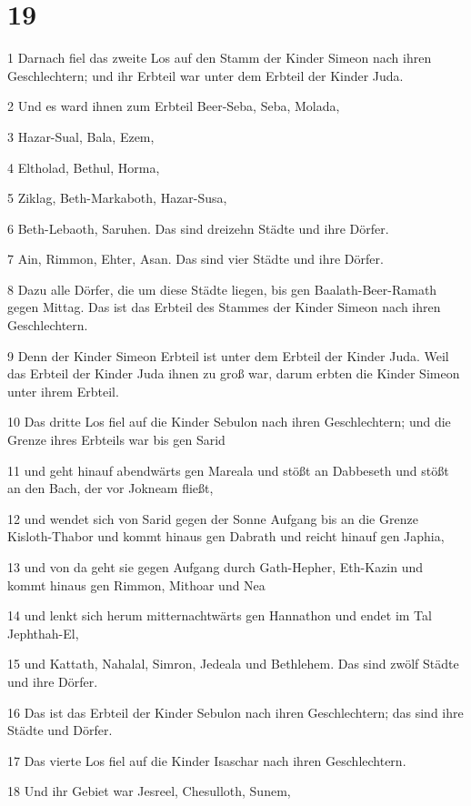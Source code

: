 \chapter{19}

\par 1 Darnach fiel das zweite Los auf den Stamm der Kinder Simeon nach ihren Geschlechtern; und ihr Erbteil war unter dem Erbteil der Kinder Juda.
\par 2 Und es ward ihnen zum Erbteil Beer-Seba, Seba, Molada,
\par 3 Hazar-Sual, Bala, Ezem,
\par 4 Eltholad, Bethul, Horma,
\par 5 Ziklag, Beth-Markaboth, Hazar-Susa,
\par 6 Beth-Lebaoth, Saruhen. Das sind dreizehn Städte und ihre Dörfer.
\par 7 Ain, Rimmon, Ehter, Asan. Das sind vier Städte und ihre Dörfer.
\par 8 Dazu alle Dörfer, die um diese Städte liegen, bis gen Baalath-Beer-Ramath gegen Mittag. Das ist das Erbteil des Stammes der Kinder Simeon nach ihren Geschlechtern.
\par 9 Denn der Kinder Simeon Erbteil ist unter dem Erbteil der Kinder Juda. Weil das Erbteil der Kinder Juda ihnen zu groß war, darum erbten die Kinder Simeon unter ihrem Erbteil.
\par 10 Das dritte Los fiel auf die Kinder Sebulon nach ihren Geschlechtern; und die Grenze ihres Erbteils war bis gen Sarid
\par 11 und geht hinauf abendwärts gen Mareala und stößt an Dabbeseth und stößt an den Bach, der vor Jokneam fließt,
\par 12 und wendet sich von Sarid gegen der Sonne Aufgang bis an die Grenze Kisloth-Thabor und kommt hinaus gen Dabrath und reicht hinauf gen Japhia,
\par 13 und von da geht sie gegen Aufgang durch Gath-Hepher, Eth-Kazin und kommt hinaus gen Rimmon, Mithoar und Nea
\par 14 und lenkt sich herum mitternachtwärts gen Hannathon und endet im Tal Jephthah-El,
\par 15 und Kattath, Nahalal, Simron, Jedeala und Bethlehem. Das sind zwölf Städte und ihre Dörfer.
\par 16 Das ist das Erbteil der Kinder Sebulon nach ihren Geschlechtern; das sind ihre Städte und Dörfer.
\par 17 Das vierte Los fiel auf die Kinder Isaschar nach ihren Geschlechtern.
\par 18 Und ihr Gebiet war Jesreel, Chesulloth, Sunem,
